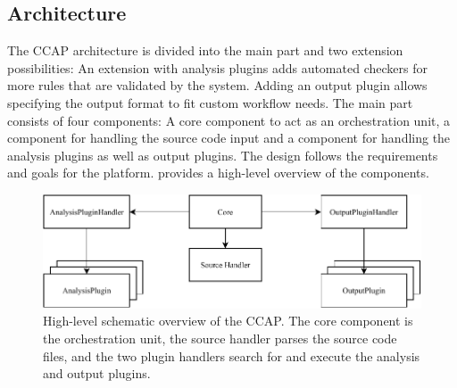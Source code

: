 \subsection{Architecture}
The CCAP architecture is divided into the main part and two extension possibilities: An extension with analysis plugins adds automated checkers for more rules that are validated by the system. Adding an output plugin allows specifying the output format to fit custom workflow needs.
The main part consists of four components: A core component to act as an orchestration unit, a component for handling the source code input and a component for handling the analysis plugins as well as output plugins. The design follows the requirements and goals for the platform.  provides a high-level overview of the components.
\begin{figure}
    \includegraphics[width=1\textwidth]{img/CCAP/overview_diagram.pdf}
    \caption{High-level schematic overview of the CCAP. The core component is the orchestration unit, the source handler parses the source code files, and the two plugin handlers search for and execute the analysis and output plugins. }
    \label{fig:overview_ccap}
\end{figure}

